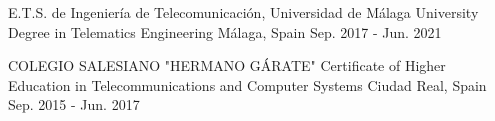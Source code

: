 

\begin{cventries}

\cventry
  {E.T.S. de Ingeniería de Telecomunicación, Universidad de Málaga} %
  {University Degree in Telematics Engineering} %
  {Málaga, Spain} %
  {Sep. 2017 - Jun. 2021} %
  {
    \begin{cvitems} %
    \end{cvitems}
  }

\cventry
  {COLEGIO SALESIANO "HERMANO GÁRATE"} %
  {Certificate of Higher Education in Telecommunications and Computer Systems} %
  {Ciudad Real, Spain} %
  {Sep. 2015 - Jun. 2017} %
  {
    \begin{cvitems} %
    \end{cvitems}
  }

\end{cventries}

